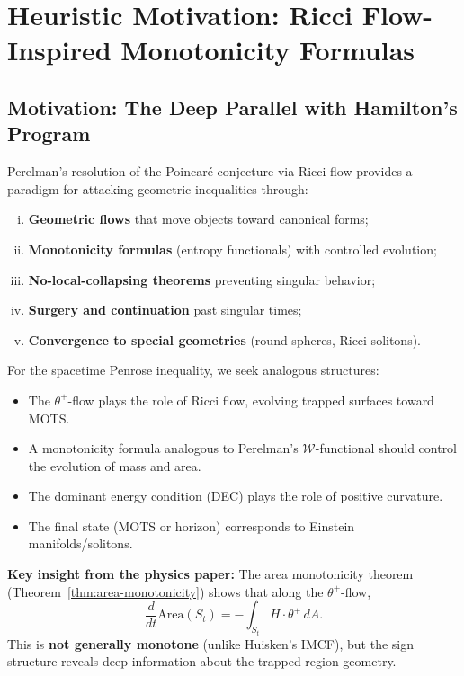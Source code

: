 \section{Heuristic Motivation: Ricci Flow-Inspired Monotonicity Formulas}
\label{sec:RicciFlowPenrose}

\subsection{Motivation: The Deep Parallel with Hamilton's Program}

Perelman's resolution of the Poincar\'e conjecture via Ricci flow \cite{perelman2002,perelman2003} provides a paradigm for attacking geometric inequalities through:
\begin{enumerate}[(i)]
\item \textbf{Geometric flows} that move objects toward canonical forms;
\item \textbf{Monotonicity formulas} (entropy functionals) with controlled evolution;
\item \textbf{No-local-collapsing theorems} preventing singular behavior;
\item \textbf{Surgery and continuation} past singular times;
\item \textbf{Convergence to special geometries} (round spheres, Ricci solitons).
\end{enumerate}

For the spacetime Penrose inequality, we seek analogous structures:
\begin{itemize}
\item The $\theta^+$-flow plays the role of Ricci flow, evolving trapped surfaces toward MOTS.
\item A monotonicity formula analogous to Perelman's $\mathcal{W}$-functional should control the evolution of mass and area.
\item The dominant energy condition (DEC) plays the role of positive curvature.
\item The final state (MOTS or horizon) corresponds to Einstein manifolds/solitons.
\end{itemize}

\textbf{Key insight from the physics paper:} The area monotonicity theorem (Theorem~\ref{thm:area-monotonicity}) shows that along the $\theta^+$-flow,
\begin{equation}
\frac{d}{dt}\mathrm{Area}(S_t) = -\int_{S_t} H \cdot \theta^+ \, dA.
\label{eq:area-evo-sign}
\end{equation}
This is \textbf{not generally monotone} (unlike Huisken's IMCF), but the sign structure reveals deep information about the trapped region geometry.

